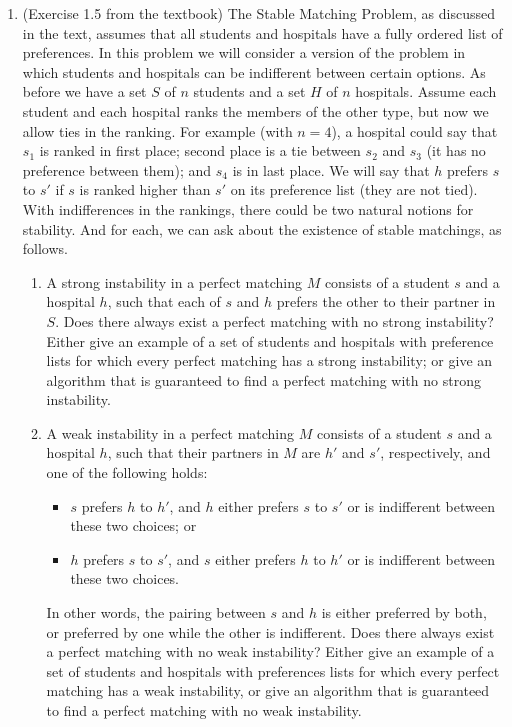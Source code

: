 \documentclass[12pt]{article}
\begin{document}
\begin{enumerate}[leftmargin=*]

\item (Exercise 1.5 from the textbook) The Stable Matching Problem, as discussed in the text, assumes that all students and hospitals have a fully ordered list of preferences. In this problem we will consider a version of the problem in which students and hospitals can be indifferent between certain options. As before we have a set $S$ of $n$ students and a set $H$ of $n$ hospitals. Assume each student and each hospital ranks the members of the other type, but now we allow ties in the ranking. For example (with $n=4$), a hospital could say that $s_1$ is ranked in first place; second place is a tie between $s_2$ and $s_3$ (it has no preference between them); and $s_4$ is in last place. We will say that $h$ prefers $s$ to $s'$ if $s$ is ranked higher than $s'$ on its preference list (they are not tied). With indifferences in the rankings, there could be two natural notions for stability. And for each, we can ask about the existence of stable matchings, as follows.

\begin{enumerate}[label=(\alph*)]
\item A strong instability in a perfect matching $M$ consists of a student $s$ and a hospital $h$, such that each of $s$ and $h$ prefers the other to their partner in $S$. Does there always exist a perfect matching with no strong instability? Either give an example of a set of students and hospitals with preference lists for which every perfect matching has a strong instability; or give an algorithm that is guaranteed to find a perfect matching with no strong instability.

\item A weak instability in a perfect matching $M$ consists of a student $s$ and a hospital $h$, such that their partners in $M$ are $h'$ and $s'$, respectively, and one of the following holds:
\begin{itemize}
\item $s$ prefers $h$ to $h'$, and $h$ either prefers $s$ to $s'$ or is indifferent between these two choices; or
\item $h$ prefers $s$ to $s'$, and $s$ either prefers $h$ to $h'$ or is indifferent between these two choices.
\end{itemize}
In other words, the pairing between $s$ and $h$ is either preferred by both, or preferred by one while the other is indifferent. Does there always exist a perfect matching with no weak instability? Either give an example of a set of students and hospitals with preferences lists for which every perfect matching has a weak instability, or give an algorithm that is guaranteed to find a perfect matching with no weak instability.
\end{enumerate}


\end{enumerate}
\end{document}
